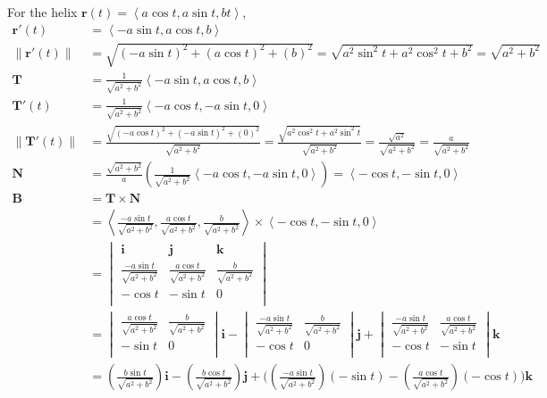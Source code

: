 \documentclass{article}
\newcommand{\lrp}[1]{\left( #1 \right)}
\newcommand{\lra}[1]{\left\langle #1 \right\rangle}
\newcommand{\norm}[1]{\left\lVert #1 \right\rVert}
\renewcommand{\i}[0]{\mathbf{i}}
\renewcommand{\j}[0]{\mathbf{j}}
\newcommand{\T}[0]{\mathbf{T}}
\newcommand{\N}[0]{\mathbf{N}}
\newcommand{\B}[0]{\mathbf{B}}
\renewcommand{\r}[0]{\mathbf{r}}
\begin{document}
For the helix $\r(t)=\lra{a\cos t, a\sin t, bt}$,
\begin{align*}
    \r'(t)&=\lra{-a\sin t, a\cos t,b}\\
    \norm{\r'(t)}&=\sqrt{(-a\sin t)^2 + (a\cos t)^2 + (b)^2}=\sqrt{a^2\sin^2 t + a^2\cos^2 t + b^2}=\sqrt{a^2 + b^2}\tag{$\sin^2 t + \cos^2 t = 1$}\\
    \T&=\frac{1}{\sqrt{a^2+b^2}}\lra{-a\sin t, a\cos t,b}\\
    \T'(t)&=\frac{1}{\sqrt{a^2+b^2}}\lra{-a\cos t, -a\sin t, 0}\\
    \norm{\T'(t)}&=\frac{\sqrt{(-a\cos t)^2+(-a\sin t)^2 + (0)^2}}{\sqrt{a^2+b^2}}=\frac{\sqrt{a^2\cos^2 t+a^2\sin^2 t}}{\sqrt{a^2+b^2}}=\frac{\sqrt{a^2}}{\sqrt{a^2+b^2}}=\frac{a}{\sqrt{a^2+b^2}}\tag{$a,b\geq0$ since they're radii}\\
    \N&=\frac{\sqrt{a^2+b^2}}{a}\lrp{\frac{1}{\sqrt{a^2+b^2}}\lra{-a\cos t, -a\sin t, 0}}=\lra{-\cos t,-\sin t,0}\\
    \B&=\T \times \N\\
    &=\lra{\frac{-a\sin t}{\sqrt{a^2+b^2}},\frac{a\cos t}{\sqrt{a^2+b^2}},\frac{b}{\sqrt{a^2+b^2}}}\times \lra{-\cos t,-\sin t,0}\\
    &=\begin{vmatrix}
\mathbf{i} & \mathbf{j} & \mathbf{k}\\
\frac{-a\sin t}{\sqrt{a^2+b^2}} & \frac{a\cos t}{\sqrt{a^2+b^2}} & \frac{b}{\sqrt{a^2+b^2}}\\
-\cos t & -\sin t & 0\\
\end{vmatrix}\\
&=\begin{vmatrix}
\frac{a\cos t}{\sqrt{a^2+b^2}} & \frac{b}{\sqrt{a^2+b^2}}\\
-\sin t & 0\\
\end{vmatrix}\mathbf{i}-
\begin{vmatrix}
\frac{-a\sin t}{\sqrt{a^2+b^2}} & \frac{b}{\sqrt{a^2+b^2}}\\
-\cos t & 0\\
\end{vmatrix}\mathbf{j}+
\begin{vmatrix}
\frac{-a\sin t}{\sqrt{a^2+b^2}} & \frac{a\cos t}{\sqrt{a^2+b^2}}\\
-\cos t & -\sin t\\
\end{vmatrix}\mathbf{k}\\
&=\lrp{\frac{b\sin t}{\sqrt{a^2+b^2}}}\i -\lrp{\frac{b\cos t}{\sqrt{a^2+b^2}}}\j+\Bigg(\left(\frac{-a\sin t}{\sqrt{a^2+b^2}}\right)\left(-\sin t\right)-\left(\frac{a\cos t}{\sqrt{a^2+b^2}}\right)\left(-\cos t\right)\Bigg)\mathbf{k}\\

\end{align*}
\end{document}
